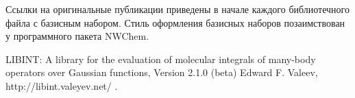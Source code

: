 \documentclass[a4paper]{book}
\begin{document}
Ссылки на оригинальные публикации приведены в начале каждого библиотечного файла с базисным набором.
Стиль оформления базисных наборов позаимствован у программного пакета NWChem.

\begin{thebibliography}{9}
 LIBINT: A library for the evaluation of molecular integrals of many-body operators over Gaussian functions, Version 2.1.0 (beta)
Edward F. Valeev, http://libint.valeyev.net/ .
\end{thebibliography}
\end{document}
